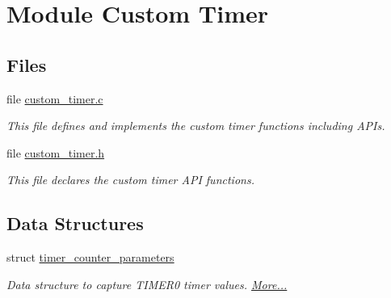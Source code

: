 \hypertarget{group__custom__timer}{}\section{Module Custom Timer}
\label{group__custom__timer}
\subsection*{Files}
\begin{DoxyCompactItemize}
\item 
file \hyperlink{custom__timer_8c}{custom\+\_\+timer.\+c}
\begin{DoxyCompactList}\small\item\em This file defines and implements the custom timer functions including A\+P\+Is. \end{DoxyCompactList}\item 
file \hyperlink{custom__timer_8h}{custom\+\_\+timer.\+h}
\begin{DoxyCompactList}\small\item\em This file declares the custom timer A\+PI functions. \end{DoxyCompactList}\end{DoxyCompactItemize}
\subsection*{Data Structures}
\begin{DoxyCompactItemize}
\item 
struct \hyperlink{group__custom__timer_structtimer__counter__parameters}{timer\+\_\+counter\+\_\+parameters}
\begin{DoxyCompactList}\small\item\em Data structure to capture T\+I\+M\+E\+R0 timer values.  \hyperlink{group__custom__timer_structtimer__counter__parameters}{More...}\end{DoxyCompactList}\end{DoxyCompactItemize}
